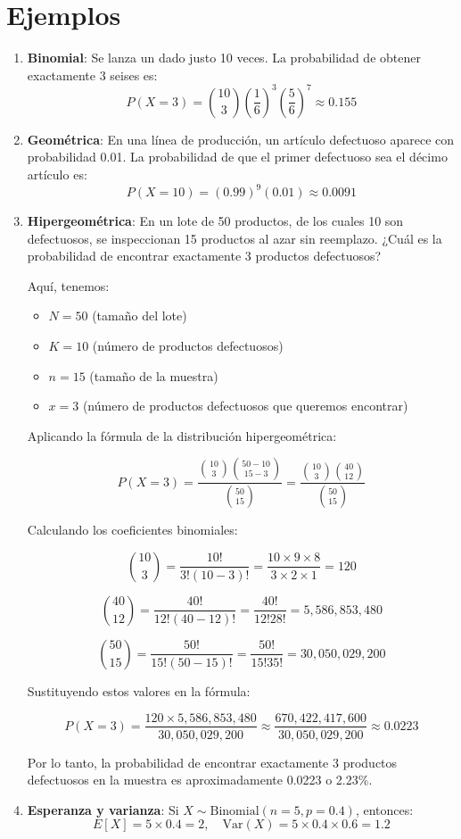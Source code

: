 \documentclass[letterpaper, 12pt]{article}
\begin{document}
	\section{Ejemplos}
	
	\begin{enumerate}
		\item \textbf{Binomial}: Se lanza un dado justo 10 veces. La probabilidad de obtener exactamente 3 seises es:
		\[ P(X = 3) = \binom{10}{3} \left(\frac{1}{6}\right)^3 \left(\frac{5}{6}\right)^7 \approx 0.155 \]
		
		\item \textbf{Geométrica}: En una línea de producción, un artículo defectuoso aparece con probabilidad 0.01. La probabilidad de que el primer defectuoso sea el décimo artículo es:
		\[ P(X = 10) = (0.99)^9 (0.01) \approx 0.0091 \]
		
		\item \textbf{Hipergeométrica}: En un lote de 50 productos, de los cuales 10 son defectuosos, se inspeccionan 15 productos al azar sin reemplazo. ¿Cuál es la probabilidad de encontrar exactamente 3 productos defectuosos?
		
		Aquí, tenemos:
		\begin{itemize}
			\item $N = 50$ (tamaño del lote)
			\item $K = 10$ (número de productos defectuosos)
			\item $n = 15$ (tamaño de la muestra)
			\item $x = 3$ (número de productos defectuosos que queremos encontrar)
		\end{itemize}
		
		Aplicando la fórmula de la distribución hipergeométrica:
		
		$$
		P(X=3) = \frac{\binom{10}{3} \binom{50-10}{15-3}}{\binom{50}{15}} = \frac{\binom{10}{3} \binom{40}{12}}{\binom{50}{15}}
		$$
		
		Calculando los coeficientes binomiales:
		
		$$
		\binom{10}{3} = \frac{10!}{3!(10-3)!} = \frac{10 \times 9 \times 8}{3 \times 2 \times 1} = 120
		$$
		
		$$
		\binom{40}{12} = \frac{40!}{12!(40-12)!} = \frac{40!}{12!28!} = 5,586,853,480
		$$
		
		$$
		\binom{50}{15} = \frac{50!}{15!(50-15)!} = \frac{50!}{15!35!} = 30,050,029,200
		$$
		
		Sustituyendo estos valores en la fórmula:
		
		$$
		P(X=3) = \frac{120 \times 5,586,853,480}{30,050,029,200} \approx \frac{670,422,417,600}{30,050,029,200} \approx 0.0223
		$$
		
		Por lo tanto, la probabilidad de encontrar exactamente 3 productos defectuosos en la muestra es aproximadamente 0.0223 o 2.23\%.
		
		\item \textbf{Esperanza y varianza}: Si $X \sim \text{Binomial}(n=5, p=0.4)$, entonces:
		\[ E[X] = 5 \times 0.4 = 2, \quad \text{Var}(X) = 5 \times 0.4 \times 0.6 = 1.2 \]
		
	\end{enumerate}
	
\end{document}

